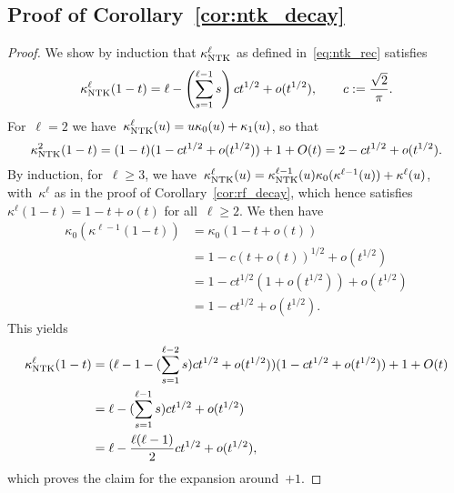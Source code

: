 
\subsection{Proof of Corollary~\ref{cor:ntk_decay}} %
\label{sub:ntk_decay_proof}

\begin{proof}
We show by induction that $\kappa_{{\text{NTK}}}^\ell$ as defined in~\eqref{eq:ntk_rec} satisfies
\begin{equation*}
\kappa_{{\text{NTK}}}^\ell(1 - t) = \ell - \left(\sum_{s=1}^{\ell-1} s \right) c t^{1/2} + o(t^{1/2}), \qquad c := \frac{\sqrt{2}}{\pi}.
\end{equation*}
For~$\ell = 2$ we have~$\kappa_{{\text{NTK}}}^\ell(u) = u \kappa_0(u) + \kappa_1(u)$, so that
\begin{equation*}
\kappa_{{\text{NTK}}}^2(1 - t) = (1 - t)(1 - c t^{1/2} + o(t^{1/2})) + 1 + O(t) = 2 - c t^{1/2} + o(t^{1/2}).
\end{equation*}
By induction, for~$\ell \geq 3$, we have~$\kappa_{{\text{NTK}}}^\ell(u) = \kappa_{{\text{NTK}}}^{\ell-1}(u) \kappa_0(\kappa^{\ell-1}(u)) + \kappa^\ell(u)$, with~$\kappa^\ell$ as in the proof of Corollary~\ref{cor:rf_decay}, which hence satisfies~$\kappa^\ell(1 - t) = 1 - t + o(t)$ for all~$\ell \geq 2$.
We then have
\begin{align*}
\kappa_0(\kappa^{\ell-1}(1 - t)) &= \kappa_0(1 - t + o(t)) \\
	&= 1 - c (t + o(t))^{1/2} + o(t^{1/2}) \\
	&= 1 - c t^{1/2} (1 + o(t^{1/2})) + o(t^{1/2}) \\
	&= 1 - c t^{1/2} + o(t^{1/2}).
\end{align*}
This yields
\begin{align*}
\kappa_{{\text{NTK}}}^\ell(1 - t) &= (\ell-1 - (\sum_{s=1}^{\ell-2}s) c t^{1/2} + o(t^{1/2})) (1 - c t^{1/2} + o(t^{1/2})) + 1 + O(t) \\
	&= \ell - (\sum_{s=1}^{\ell-1} s)c t^{1/2} + o(t^{1/2}) \\
	&= \ell - \frac{\ell (\ell-1)}{2} c t^{1/2} + o(t^{1/2}),
\end{align*}
which proves the claim for the expansion around~$+1$.


\end{proof}
